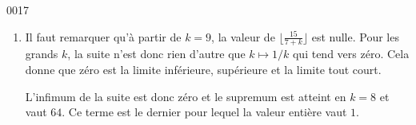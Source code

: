 \begin{corrige}{0017}
\begin{enumerate}
\item Il faut remarquer qu'à partir de $k=9$, la valeur de $\lfloor\frac{ 15 }{ 7+k }\rfloor$ est nulle. Pour les grands $k$, la suite n'est donc rien d'autre que $k\mapsto 1/k$ qui tend vers zéro. Cela donne que zéro est la limite inférieure, supérieure et la limite tout court.

L'infimum de la suite est donc zéro et le supremum est atteint en $k=8$ et vaut $64$. Ce terme est le dernier pour lequel la valeur entière vaut $1$. 

\end{enumerate}

\end{corrige}

